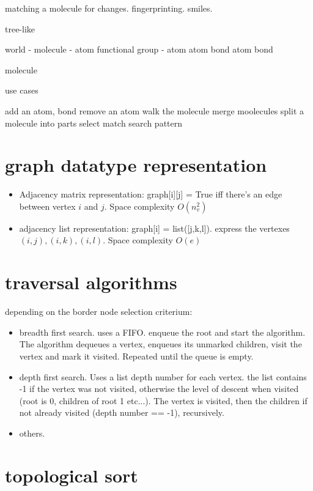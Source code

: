 \documentclass[a4paper,12pt,oneside]{book}
\begin{document}
matching a molecule for changes. fingerprinting. smiles.


tree-like

world - molecule - atom
                   functional group - atom
                                      atom
                                      bond
                   atom
                   bond
        
        molecule

use cases

add an atom, bond
remove an atom
walk the molecule
merge moolecules
split a molecule into parts
select
match search pattern



\section{graph datatype representation}
\begin{itemize}
\item Adjacency matrix representation: graph[i][j] = True iff there's an
edge between vertex $i$ and $j$. Space complexity $O(n_{v}^2)$
\item adjacency list representation: graph[i] = list([j,k,l]). express the
vertexes $(i,j), (i,k), (i,l)$. Space complexity $O(e)$
\end{itemize}

\section{traversal algorithms}

depending on the border node selection criterium:
\begin{itemize}
\item breadth first search. uses a FIFO. enqueue the root and start the
algorithm. The algorithm dequeues a vertex, enqueues its unmarked children,
visit the vertex and mark it visited. Repeated until the queue is empty.
\item depth first search. Uses a list depth number for each vertex. the list
contains -1 if the vertex was not visited, otherwise the level of descent
when visited (root is 0, children of root 1 etc...). The vertex is visited,
then the children if not already visited (depth number == -1), recursively.
\item others.
\end{itemize}

\section{topological sort}
\end{document}

